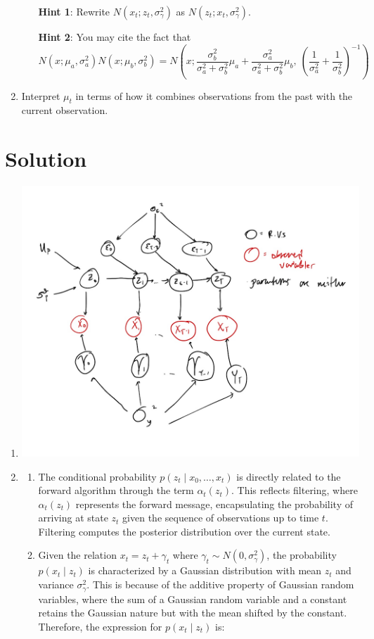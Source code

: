 \documentclass[submit]{harvardml}
\newcommand{\siggam}{\sigma_{\gamma}}
\newenvironment{solution}
  {\color{blue}\section*{Solution}}
{}
\begin{document}
\begin{problem}
\begin{enumerate}
\begin{enumerate}
      \textbf{Hint 1}: Rewrite $N(x_t; z_t, \siggam^2)$ as $N(z_t; x_t, \siggam^2)$.
      
      \textbf{Hint 2}: You may cite the fact that 
      \[N(x; \mu_a, \sigma^2_a)N(x; \mu_b, \sigma^2_b) = N\left(x; \frac{\sigma^2_b}{\sigma^2_a+\sigma^2_b}\mu_a + \frac{\sigma^2_a}{\sigma^2_a+\sigma^2_b}\mu_b, \ \left(\frac{1}{\sigma^2_a} + \frac{1}{\sigma^2_b}\right)^{-1}\right)\]
  \end{enumerate}
  \item Interpret $\mu_t$ in terms of how it combines observations from the past with the current observation. 
\end{enumerate}
\end{problem}

\newpage

\begin{solution}
\begin{enumerate}

\item \includegraphics[width=0.5\linewidth]{hw6/prob1a.png} 
\item 
\begin{enumerate}
    \item The conditional probability \( p(z_t \mid x_0, \ldots, x_t) \) is directly related to the forward algorithm through the term \( \alpha_t(z_t) \). This reflects filtering, where \( \alpha_t(z_t) \) represents the forward message, encapsulating the probability of arriving at state \( z_t \) given the sequence of observations up to time \( t \). Filtering computes the posterior distribution over the current state.
    \item Given the relation \( x_t = z_t + \gamma_t \) where \( \gamma_t \sim N(0, \sigma_{\gamma}^2) \), the probability \( p(x_t \mid z_t) \) is characterized by a Gaussian distribution with mean \( z_t \) and variance \( \sigma_{\gamma}^2 \). This is because of the additive property of Gaussian random variables, where the sum of a Gaussian random variable and a constant retains the Gaussian nature but with the mean shifted by the constant. Therefore, the expression for \( p(x_t \mid z_t) \) is:


\end{enumerate}
\end{enumerate}
\end{solution}
\end{document}
